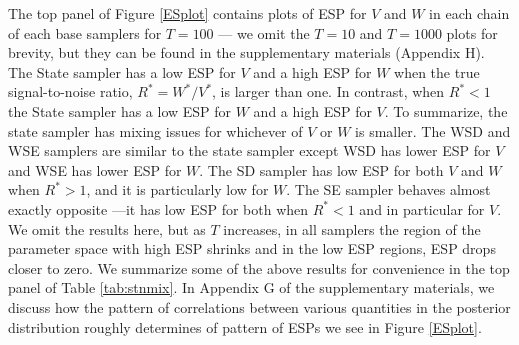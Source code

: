 \documentclass[12pt]{article}
\begin{document}
The top panel of Figure \ref{ESplot} contains plots of ESP for $V$ and $W$ in each chain of each base samplers for $T=100$ --- we omit the $T=10$ and $T=1000$ plots for brevity, but they can be found in the supplementary materials (Appendix H). The State sampler has a low ESP for $V$ and a high ESP for $W$ when the true signal-to-noise ratio, $R^*=W^*/V^*$, is larger than one. In contrast, when $R^*<1$ the State sampler has a low ESP for $W$ and a high ESP for $V$. To summarize, the state sampler has mixing issues for whichever of $V$ or $W$ is smaller. The WSD and WSE samplers are similar to the state sampler except WSD has lower ESP for $V$ and WSE has lower ESP for $W$. The SD sampler has low ESP for both $V$ and $W$ when $R^*>1$, and it is particularly low for $W$. The SE sampler behaves almost exactly opposite ---it has low ESP for both when $R^*<1$ and in particular for $V$. We omit the results here, but as $T$ increases, in all samplers the region of the parameter space with high ESP shrinks and in the low ESP regions, ESP drops closer to zero. We summarize some of the above results for convenience in the top panel of Table \ref{tab:stnmix}. In Appendix G of the supplementary materials, we discuss how the pattern of correlations between various quantities in the posterior distribution roughly determines of pattern of ESPs we see in Figure \ref{ESplot}.
\end{document}
